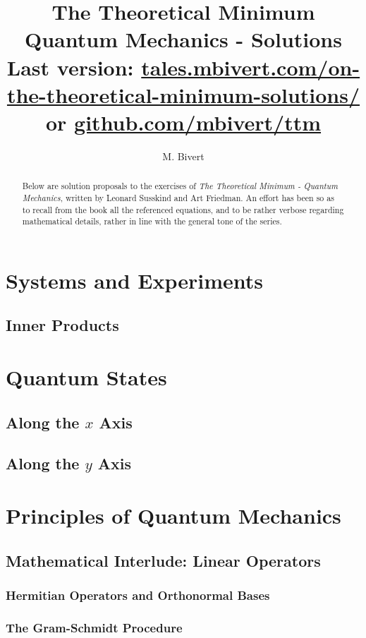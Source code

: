 \documentclass[a4paper]{article}
\author{M. Bivert}
\title{The Theoretical Minimum \\
	{\Large Quantum Mechanics - Solutions} \\
	{\footnotesize Last version: %
		\href{https://tales.mbivert.com/on-the-theoretical-minimum-solutions/}%
		{tales.mbivert.com/on-the-theoretical-minimum-solutions/} or %
		\href{https://github.com/mbivert/ttm}{github.com/mbivert/ttm}}
}
\begin{document}
\maketitle
\begin{abstract}
Below are solution proposals to the exercises of
\textit{The Theoretical Minimum - Quantum Mechanics}, written
by Leonard Susskind and Art Friedman. An effort has been
so as to recall from the book all the referenced equations,
and to be rather verbose regarding mathematical details, rather
in line with the general tone of the series.
\end{abstract}

\tableofcontents

\section{Systems and Experiments}
\subsection{Inner Products}


\section{Quantum States}
\subsection{Along the $x$ Axis}

\subsection{Along the $y$ Axis}


\section{Principles of Quantum Mechanics}
\subsection{Mathematical Interlude: Linear Operators}
\subsubsection{Hermitian Operators and Orthonormal Bases}

\subsubsection{The Gram-Schmidt Procedure}
\end{document}
